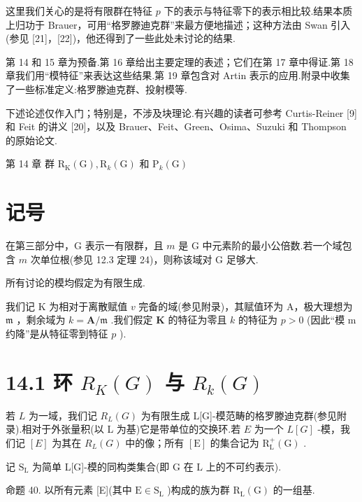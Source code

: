 \documentclass[10pt]{article}
\begin{document}
这里我们关心的是将有限群在特征 \(p\) 下的表示与特征零下的表示相比较.结果本质上归功于 Brauer，可用“格罗滕迪克群”来最方便地描述；这种方法由 Swan 引入(参见 [21]，[22])，他还得到了一些此处未讨论的结果.

第 14 和 15 章为预备.第 16 章给出主要定理的表述；它们在第 17 章中得证.第 18 章我们用“模特征”来表达这些结果.第 19 章包含对 Artin 表示的应用.附录中收集了一些标准定义:格罗滕迪克群、投射模等.

下述论述仅作入门；特别是，不涉及块理论.有兴趣的读者可参考 Curtis-Reiner [9] 和 Feit 的讲义 [20]，以及 Brauer、Feit、Green、Osima、Suzuki 和 Thompson 的原始论文.

第 14 章 群 \({\mathrm{R}}_{\mathrm{K}}\left( \mathrm{G}\right) ,{\mathrm{R}}_{k}\left( \mathrm{G}\right)\) 和 \({\mathrm{P}}_{k}\left( \mathrm{G}\right)\)

\section*{记号}

在第三部分中，G 表示一有限群，且 \(m\) 是 G 中元素阶的最小公倍数.若一个域包含 \(m\) 次单位根(参见 12.3 定理 24)，则称该域对 G 足够大.

所有讨论的模均假定为有限生成.

我们记 \(\mathrm{K}\) 为相对于离散赋值 \(v\) 完备的域(参见附录)，其赋值环为 A，极大理想为 \(\mathfrak{m}\) ，剩余域为 \(k = \mathbf{A}/\mathfrak{m}\) .我们假定 \(\mathbf{K}\) 的特征为零且 \(k\) 的特征为 \(p > 0\) (因此“模 m 约降”是从特征零到特征 \(p\) ).

\section*{14.1 环 \({R}_{K}\left( G\right)\) 与 \({R}_{k}\left( G\right)\)}

若 \(L\) 为一域，我们记 \({R}_{L}\left( G\right)\) 为有限生成 L[G]-模范畴的格罗滕迪克群(参见附录).相对于外张量积(以 L 为基)它是带单位的交换环.若 \(E\) 为一个 \(L\left\lbrack  G\right\rbrack\) -模，我们记 \(\left\lbrack  E\right\rbrack\) 为其在 \({R}_{L}\left( G\right)\) 中的像；所有 \(\left\lbrack  \mathrm{E}\right\rbrack\) 的集合记为 \({\mathrm{R}}_{\mathrm{L}}^{ + }\left( \mathrm{G}\right)\) .

记 \({\mathrm{S}}_{\mathrm{L}}\) 为简单 L[G]-模的同构类集合(即 \(\mathrm{G}\) 在 \(\mathrm{L}\) 上的不可约表示).

命题 40. 以所有元素 [E](其中 \(\mathrm{E} \in  {\mathrm{S}}_{\mathrm{L}}\) )构成的族为群 \({\mathrm{R}}_{\mathrm{L}}\left( \mathrm{G}\right)\) 的一组基.
\end{document}
